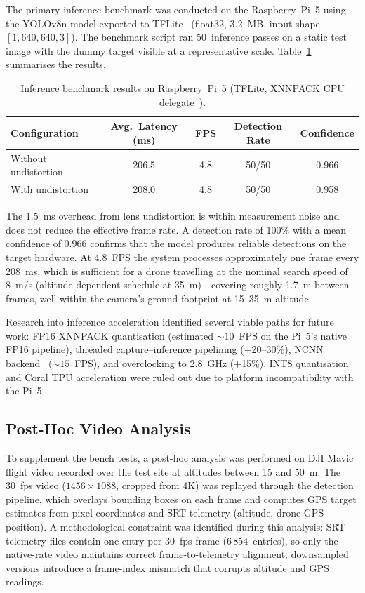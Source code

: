 The primary inference benchmark was conducted on the Raspberry~Pi~5 using the YOLOv8n model exported to TFLite~\cite{tflite} (float32, 3.2~MB, input shape $[1, 640, 640, 3]$). The benchmark script ran 50~inference passes on a static test image with the dummy target visible at a representative scale. Table~\ref{tab:benchmark-results} summarises the results.

\begin{table}[H]
\centering
\caption{Inference benchmark results on Raspberry~Pi~5 (TFLite, XNNPACK CPU delegate~\cite{xnnpack}).}
\label{tab:benchmark-results}
\small
\begin{tabular}{@{}lcccc@{}}
\toprule
\textbf{Configuration} & \textbf{Avg.\ Latency (ms)} & \textbf{FPS} & \textbf{Detection Rate} & \textbf{Confidence} \\
\midrule
Without undistortion & 206.5 & 4.8 & 50/50 & 0.966 \\
With undistortion    & 208.0 & 4.8 & 50/50 & 0.958 \\
\bottomrule
\end{tabular}
\end{table}

The 1.5~ms overhead from lens undistortion is within measurement noise and does not reduce the effective frame rate. A detection rate of 100\% with a mean confidence of 0.966 confirms that the model produces reliable detections on the target hardware. At 4.8~FPS the system processes approximately one frame every 208~ms, which is sufficient for a drone travelling at the nominal search speed of 8~m/s (altitude-dependent schedule at 35~m)---covering roughly 1.7~m between frames, well within the camera's ground footprint at 15--35~m altitude.

Research into inference acceleration identified several viable paths for future work: FP16 XNNPACK quantisation (estimated ${\sim}10$~FPS on the Pi~5's native FP16 pipeline), threaded capture--inference pipelining ($+$20--30\%), NCNN backend~\cite{ncnn} (${\sim}15$~FPS), and overclocking to 2.8~GHz ($+$15\%). INT8 quantisation and Coral TPU acceleration were ruled out due to platform incompatibility with the Pi~5~\cite{edgeai}.

\subsection{Post-Hoc Video Analysis}\label{sec:dji-analysis}

To supplement the bench tests, a post-hoc analysis was performed on DJI Mavic flight video recorded over the test site at altitudes between 15 and 50~m. The 30~fps video ($1456 \times 1088$, cropped from 4K) was replayed through the detection pipeline, which overlays bounding boxes on each frame and computes GPS target estimates from pixel coordinates and SRT telemetry (altitude, drone GPS position). A methodological constraint was identified during this analysis: SRT telemetry files contain one entry per 30~fps frame (6\,854~entries), so only the native-rate video maintains correct frame-to-telemetry alignment; downsampled versions introduce a frame-index mismatch that corrupts altitude and GPS readings.


